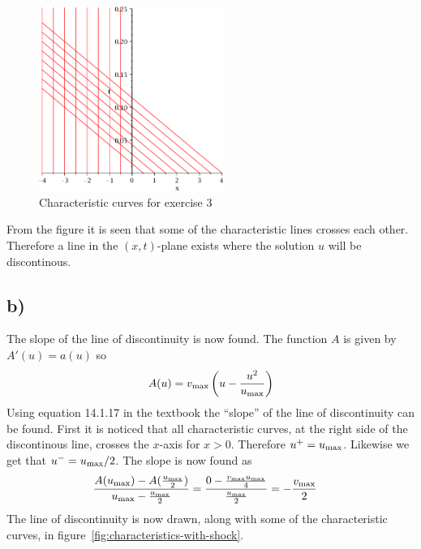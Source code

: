     \begin{figure}[!ht]
        \centering
        \includegraphics[width=60mm]{media/characteristics-ex3.pdf}
        \caption{Characteristic curves for exercise 3}
        \label{fig:characteristics-q3}
    \end{figure}

    From the figure it is seen that some of the characteristic lines crosses each other. Therefore a line in the $(x,t)$-plane exists where the solution $u$ will be discontinous.

    \subsection*{b)}
    The slope of the line of discontinuity is now found. The function $A$ is given by $A'(u) = a(u)$ so
    \begin{equation*}
        A(u) = v_{\text{max}}\left(u-\frac{u^2}{u_{\text{max}}}\right)
    \end{equation*}
    Using equation 14.1.17 in the textbook the ``slope'' of the line of discontinuity can be found. First it is noticed that all characteristic curves, at the right side of the discontinous line, crosses the $x$-axis for $x>0$. Therefore $u^+=u_{\text{max}}$. Likewise we get that $u^-=u_{\text{max}}/2$. The slope is now found as
    \begin{align*}
        \frac{A(u_{\text{max}}) - A(\frac{u_{\text{max}}}{2})}{u_{\text{max}} - \frac{u_{\text{max}}}{2}} &= \frac{0 - \frac{v_{\text{max}}u_{\text{max}}}{4}}{\frac{u_{\text{max}}}{2}} = -\frac{v_{\text{max}}}{2}
    \end{align*}
    The line of discontinuity is now drawn, along with some of the characteristic curves, in figure~\ref{fig:characteristics-with-shock}.

